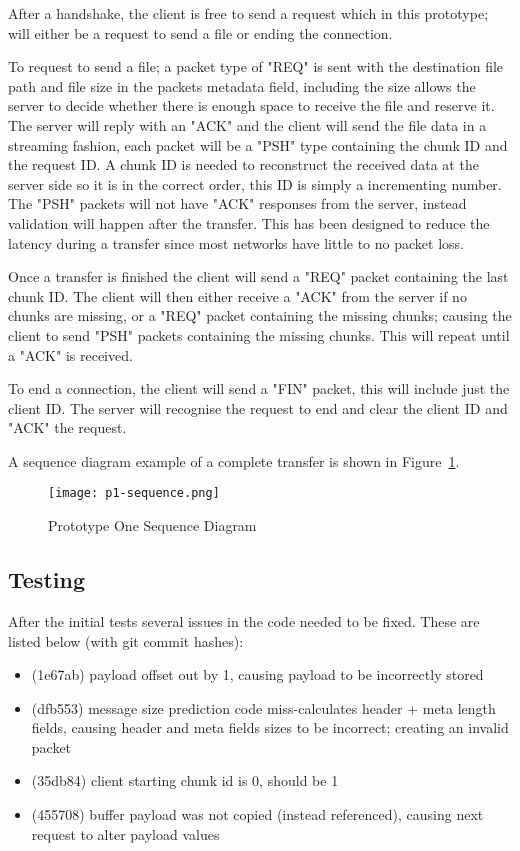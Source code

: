 After a handshake, the client is free to send a request which in this prototype; will either be a request to send a file or ending the connection.

To request to send a file; a packet type of "REQ" is sent with the destination file path and file size in the packets metadata field, including the size allows the server to decide whether there is enough space to receive the file and reserve it. The server will reply with an "ACK" and the client will send the file data in a streaming fashion, each packet will be a "PSH" type containing the chunk ID and the request ID. A chunk ID is needed to reconstruct the received data at the server side so it is in the correct order, this ID is simply a incrementing number. The "PSH" packets will not have "ACK" responses from the server, instead validation will happen after the transfer. This has been designed to reduce the latency during a transfer since most networks have little to no packet loss.

Once a transfer is finished the client will send a "REQ" packet containing the last chunk ID. The client will then either receive a "ACK" from the server if no chunks are missing, or a "REQ" packet containing the missing chunks; causing the client to send "PSH" packets containing the missing chunks. This will repeat until a "ACK" is received.

To end a connection, the client will send a "FIN" packet, this will include just the client ID. The server will recognise the request to end and clear the client ID and "ACK" the request.

A sequence diagram example of a complete transfer is shown in Figure~\ref{fig:p1-sequence}.

\begin{figure}[h!]
    \centering
    \texttt{[image: p1-sequence.png]}
    \caption{Prototype One Sequence Diagram}
    \label{fig:p1-sequence}
\end{figure}

\subsection*{Testing}
After the initial tests several issues in the code needed to be fixed. These are listed below (with git commit hashes):

\begin{itemize}
    \item (1e67ab) payload offset out by 1, causing payload to be incorrectly stored
    \item (dfb553) message size prediction code miss-calculates header + meta length fields, causing header and meta fields sizes to be incorrect; creating an invalid packet
    \item (35db84) client starting chunk id is 0, should be 1
    \item (455708) buffer payload was not copied (instead referenced), causing next request to alter payload values
\end{itemize}

